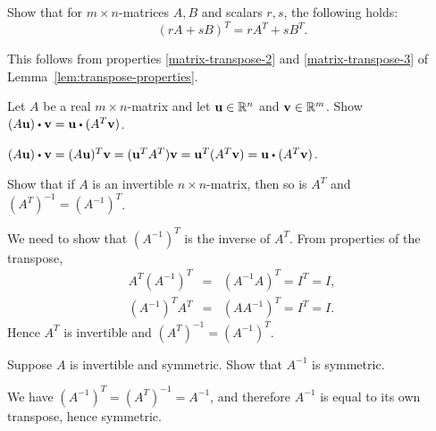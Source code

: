 \begin{ex}
  Show that for $m \times n$-matrices $A,B$ and scalars $r, s$, the
  following holds:
  \begin{equation*}
    (rA + sB)^T = rA^T + sB^T.
  \end{equation*}
  \vspace{-4ex}
  \begin{sol}
    This follows from properties {\ref{matrix-transpose-2}} and
    {\ref{matrix-transpose-3}} of
    Lemma~\ref{lem:transpose-properties}.
  \end{sol}
\end{ex}

\begin{ex} \label{exer-Rn3}  Let $A$ be a real $m\times n$-matrix and
  let $\vect{u}\in \R^n$ and $\vect{v}\in \R^m$. Show
  $(A\vect{u})\dotprod \vect{v}=\vect{u}\dotprod (A^T\vect{v})$.
  \begin{sol}
    $(A\vect{u})\dotprod \vect{v} = (A\vect{u})^T\vect{v} =
    (\vect{u}^TA^T)\vect{v}  = \vect{u}^T(A^T\vect{v}) =
    \vect{u}\dotprod (A^T\vect{v})$.
  \end{sol}
\end{ex}

\begin{ex}
  Show that if $A$ is an invertible $n\times n$-matrix, then so is
  $A^T $ and $(A^T)^{-1}=(A^{-1})^T$.
  \begin{sol}
    We need to show that $(A^{-1})^T$ is the inverse of
    $A^T$. From properties of the transpose,
    \begin{eqnarray*}
      A^T(A^{-1})^T &=& (A^{-1}A)^T=I^T=I, \\
      (A^{-1})^TA^T &=& (AA^{-1})^T=I^T=I.
    \end{eqnarray*}
    Hence $A^T$ is invertible and $(A^T)^{-1}=(A^{-1})^T$.
  \end{sol}
\end{ex}

\begin{ex}
  Suppose $A$ is invertible and symmetric. Show that $A^{-1}$ is
  symmetric.
  \begin{sol}
    We have $(A^{-1})^T = (A^T)^{-1} = A^{-1}$, and therefore $A^{-1}$
    is equal to its own transpose, hence symmetric.
  \end{sol}
\end{ex}

